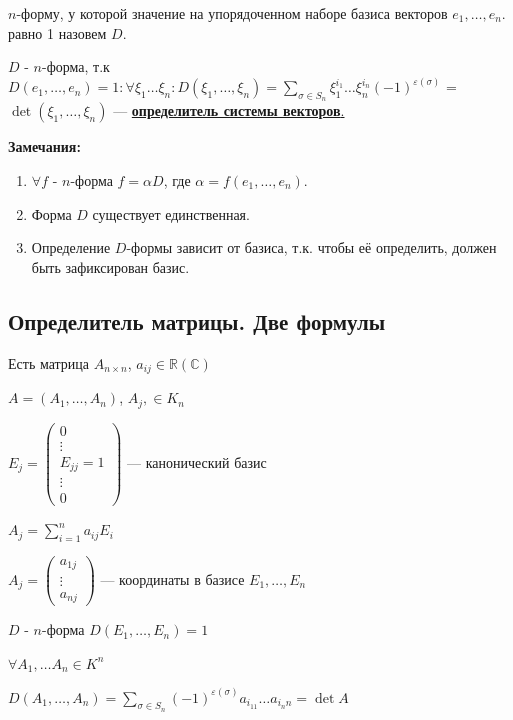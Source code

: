 \documentclass[twoside]{book}
\begin{document}
\(n\)-форму, у которой значение на упорядоченном наборе базиса векторов \(e_1,\ldots,e_n\). равно 1 назовем \(D\).

\(D\) - \(n\)-форма, т.к \(D(e_1,\ldots,e_n) = 1: \forall \xi_1 \ldots \xi_n: D(\xi_1,\ldots, \xi_n) = \sum\limits_{\sigma \in S_n} \xi_1^{i_1} \ldots \xi_n^{i_n} (-1)^{\varepsilon(\sigma)}\) = \(\det (\xi_1,\ldots, \xi_n)\) --- \uline{\textbf{определитель системы векторов}.}

\textbf{Замечания:}
\begin{enumerate}
    \item \(\forall f\) - \(n\)-форма  \(f = \alpha D\), где \(\alpha = f(e_1,\ldots,e_n)\).
    \item Форма \(D\) существует единственная.
    \item Определение \(D\)-формы зависит от базиса, т.к. чтобы её определить, должен быть зафиксирован базис.
\end{enumerate}

\subsection{Определитель матрицы. Две формулы}

Есть матрица \(A_{n\times n}\), \(a_{ij} \in \mathbb{R}(\mathbb{C})\)

\(A = (A_1, \ldots, A_n)\), \(A_j, \in K_n\)

\(E_j =
\begin{pmatrix}
    0          \\
    \vdots     \\
    E_{jj} = 1 \\
    \vdots     \\
    0
\end{pmatrix}\) --- канонический базис

\(A_j = \sum\limits_{i = 1}^n a_{ij} E_i\)

\(A_j =
\begin{pmatrix}
    a_{1j} \\
    \vdots \\
    a_{nj}
\end{pmatrix}\) --- координаты в базисе \(E_1, \ldots, E_n\)

\(D\) - \(n\)-форма \(D(E_1,\ldots, E_n) =1 \)

\(\forall A_1,\ldots A_n \in K^n \)

\(D(A_1,\ldots,A_n)  = \sum\limits_{\sigma \in S_n} (-1)^{\varepsilon(\sigma)} a_{i_11}\ldots a_{i_nn} = \det A\)
\end{document}
